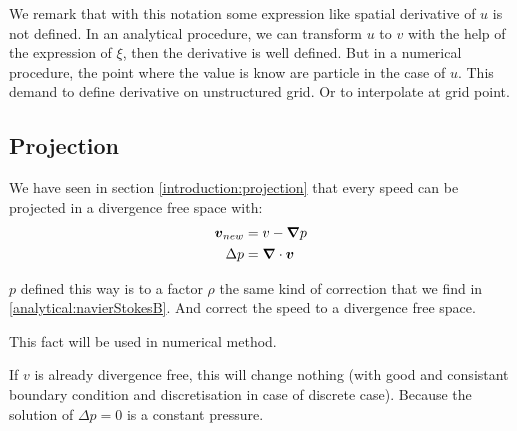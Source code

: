 \begin{rem}
We remark that with this notation some expression like spatial derivative of $u$ is not defined.
In an analytical procedure, we can transform $u$ to $v$ with the help of the expression of $\xi$, then the derivative is well defined.
But in a numerical procedure, the point where the value is know are particle in the case of $u$. This demand to define derivative on unstructured grid.
Or to interpolate at grid point.
\end{rem}

\subsection{Projection}

We have seen in section \ref{introduction:projection} that every speed can be projected in a divergence free space with:
\begin{align}
 {\boldsymbol v_{new}}&=v-{\boldsymbol \nabla}p\\
 \Delta p&={\boldsymbol \nabla} \cdot {\boldsymbol v}
\end{align}

$p$ defined this way is to a factor $\rho$ the same kind of correction that we find in \ref{analytical:navierStokesB}.
And correct the speed to a divergence free space.

This fact will be used in numerical method.

If $v$ is already divergence free, this will change nothing (with good and consistant boundary condition and discretisation in case of discrete case).
Because the solution of $\Delta p=0$ is a constant pressure.

